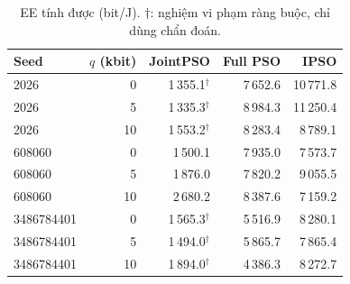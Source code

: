 \begin{table}
\centering
\renewcommand{\arraystretch}{1.16}
\setlength{\tabcolsep}{5pt}
\begin{tabular}{lrrrr}
\toprule
Seed & $q$ (kbit) & JointPSO & Full PSO & IPSO \\
\midrule
2026 & 0 & 1\,355.1$^{\dagger}$ & 7\,652.6 & 10\,771.8 \\
2026 & 5 & 1\,335.3$^{\dagger}$ & 8\,984.3 & 11\,250.4 \\
2026 & 10 & 1\,553.2$^{\dagger}$ & 8\,283.4 & 8\,789.1 \\
608060 & 0 & 1\,500.1 & 7\,935.0 & 7\,573.7 \\
608060 & 5 & 1\,876.0 & 7\,820.2 & 9\,055.5 \\
608060 & 10 & 2\,680.2 & 8\,387.6 & 7\,159.2 \\
3486784401 & 0 & 1\,565.3$^{\dagger}$ & 5\,516.9 & 8\,280.1 \\
3486784401 & 5 & 1\,494.0$^{\dagger}$ & 5\,865.7 & 7\,865.4 \\
3486784401 & 10 & 1\,894.0$^{\dagger}$ & 4\,386.3 & 8\,272.7 \\
\bottomrule
\end{tabular}
\caption{EE tính được (bit/J). $\dagger$: nghiệm vi phạm ràng buộc, chỉ dùng chẩn đoán.}
\end{table}
